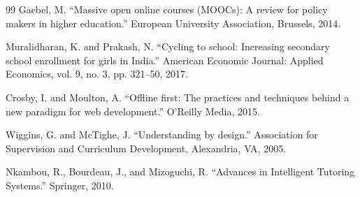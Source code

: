 \documentclass[10pt,conference,compsocconf]{IEEEtran}
\begin{document}
\begin{thebibliography}{99}
 Gaebel, M. ``Massive open online courses (MOOCs): A review for policy makers in higher education.'' European University Association, Brussels, 2014.

 Muralidharan, K. and Prakash, N. ``Cycling to school: Increasing secondary school enrollment for girls in India.'' American Economic Journal: Applied Economics, vol. 9, no. 3, pp. 321--50, 2017.

 Crosby, I. and Moulton, A. ``Offline first: The practices and techniques behind a new paradigm for web development.'' O'Reilly Media, 2015.

 Wiggins, G. and McTighe, J. ``Understanding by design.'' Association for Supervision and Curriculum Development, Alexandria, VA, 2005.

 Nkambou, R., Bourdeau, J., and Mizoguchi, R. ``Advances in Intelligent Tutoring Systems.'' Springer, 2010.

\end{thebibliography}
\end{document}

